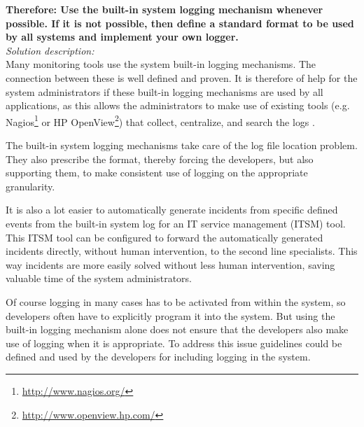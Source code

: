 \begin{center}
   
\end{center}

\textbf{Therefore:
Use the built-in system logging mechanism whenever possible.
If it is not possible, then define a standard format to be used by all systems 
and implement your own logger.}\\

\textit{Solution description:}\\
Many monitoring tools use the system built-in logging mechanisms. The connection between these is well defined and proven. It is therefore of help for the system administrators if these built-in logging mechanisms are used by all applications, as this allows the administrators to make use of existing tools (e.g. Nagios\footnote{\url{http://www.nagios.org/}} or HP OpenView\footnote{\url{http://www.openview.hp.com/}}) that collect, centralize, and search the logs \cite{Limoncelli2011a}.

The built-in system logging mechanisms take care of the log file location problem. They also prescribe the format, thereby forcing the developers, but also supporting them, to make consistent use of logging on the appropriate granularity.

It is also a lot easier to automatically generate incidents from specific defined events from the built-in system log for an IT service management (ITSM) tool. This ITSM tool can be configured to forward the automatically generated incidents directly, without human intervention, to the second line specialists. This way incidents are more easily solved without less human intervention, saving valuable time of the system administrators.

Of course logging in many cases has to be activated from within the system, so developers often have to explicitly program it into the system. But using the built-in logging mechanism alone does not ensure that the developers also make use of logging when it is appropriate. To address this issue guidelines could be defined and used by the developers for including logging in the system. 

